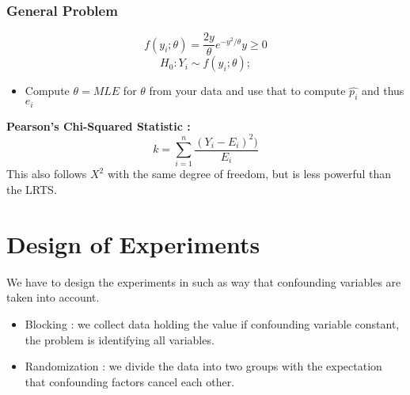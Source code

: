 \documentclass{article}
\begin{document}
\subsubsection*{General Problem}
$$ f(y_i; \theta) = \frac{2y}{\theta} e^{-y^2 / \theta}   y \geq 0 $$
$$ H_0 : Y_i \sim f(y_i ; \theta); $$
\begin{itemize}
\item Compute \(\theta = MLE\) for \(\theta\) from your data and use that to compute \(\hat{p_i}\) and thus \(e_i\)
\end{itemize}

\textbf{Pearson's Chi-Squared Statistic : }
$$ k = \sum_{i=1}^n \frac{(Y_i - E_i)^2)}{E_i} $$
This also follows \(X^2\) with the same degree of freedom, but is less powerful than the LRTS.  

\section{Design of Experiments}
We have to design the experiments in such as way that confounding variables are taken into account. 

\begin{itemize}
\item Blocking : we collect data holding the value if confounding variable constant, the problem is identifying all variables.
\item Randomization : we divide the data into two groups with the expectation that confounding factors cancel each other. 
\end{itemize}
\end{document}
